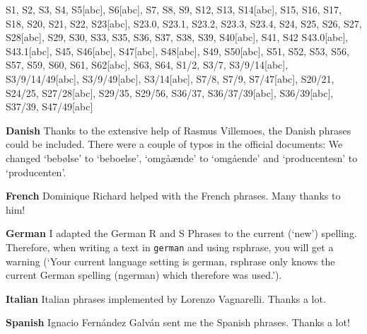 \documentclass[a4paper,notitlepage,parskip=half]{scrreprt}
\begin{document}
S1,
S2,
S3,
S4,
S5[abc],
S6[abc],
S7,
S8,
S9,
S12,
S13,
S14[abc],
S15,
S16,
S17,
S18,
S20,
S21,
S22,
S23[abc],
S23.0,
S23.1,
S23.2,
S23.3,
S23.4,
S24,
S25,
S26,
S27,
S28[abc],
S29,
S30,
S33,
S35,
S36,
S37,
S38,
S39,
S40[abc],
S41,
S42
S43.0[abc],
S43.1[abc],
S45,
S46[abc],
S47[abc],
S48[abc],
S49,
S50[abc],
S51,
S52,
S53,
S56,
S57,
S59,
S60,
S61,
S62[abc],
S63,
S64,
S1/2,
S3/7,
S3/9/14[abc],
S3/9/14/49[abc],
S3/9/49[abc],
S3/14[abc],
S7/8,
S7/9,
S7/47[abc],
S20/21,
S24/25,
S27/28[abc],
S29/35,
S29/56,
S36/37,
S36/37/39[abc],
S36/39[abc],
S37/39,
S47/49[abc]

\textbf{Danish}
Thanks to the extensive help of Rasmus Villemoes, the Danish phrases could be included. There were a couple of typos in the official documents: We changed `bebølse' to `beboelse', `omgåænde' to `omgående' and `producentesn' to `producenten'.

\textbf{French}
Dominique Richard helped with the French phrases. Many thanks to him!

\textbf{German}
I adapted the German R and S Phrases to the current (`new') spelling. Therefore, when writing a text in \verb|german| and using rsphrase, you will get a warning (`Your current language setting is german, rsphrase only knows the current German spelling (ngerman) which therefore was used.').

\textbf{Italian}
Italian phrases implemented by Lorenzo Vagnarelli. Thanks a lot.

\textbf{Spanish}
Ignacio Fernández Galván sent me the Spanish phrases. Thanks a lot!
\egroup
\end{document}
